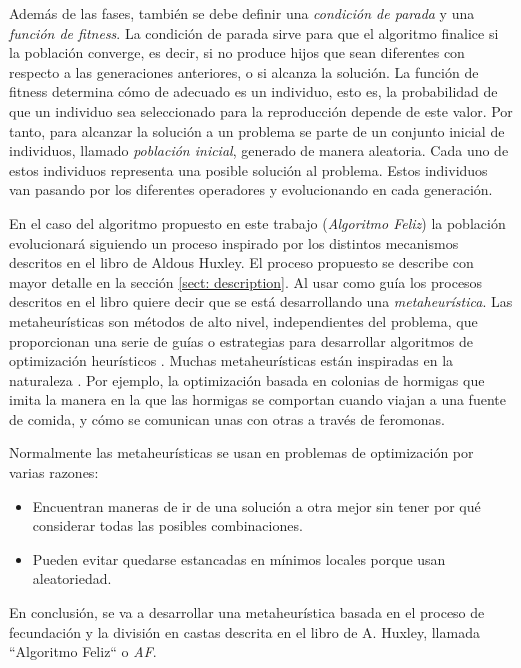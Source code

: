 Además de las fases, también se debe definir una \emph{condición de parada} y una \emph{función de fitness}. La
condición de parada sirve para que el algoritmo finalice si la población converge, es decir, si no produce hijos 
que sean diferentes con respecto a las generaciones anteriores, o si alcanza la solución. La función de fitness
determina cómo de adecuado es un individuo, esto es, la probabilidad de que un individuo sea seleccionado para
la reproducción depende de este valor. Por tanto, para alcanzar la solución a un problema se parte de un conjunto 
inicial de individuos, llamado \textit{población inicial}, generado de manera aleatoria. Cada uno de estos 
individuos representa una posible solución al problema. Estos individuos van pasando por los diferentes operadores y 
evolucionando en cada generación.

En el caso del algoritmo propuesto en este trabajo (\emph{Algoritmo Feliz}) la población evolucionará siguiendo un proceso 
inspirado por los distintos mecanismos descritos en el libro de Aldous Huxley. El proceso propuesto se describe con mayor detalle
en la sección \ref{sect: description}. Al usar como guía los procesos descritos en el libro quiere decir que se está desarrollando 
una \textit{metaheurística}. Las  metaheurísticas son métodos de alto nivel, independientes del problema, que proporcionan una serie de guías o
estrategias para desarrollar algoritmos de optimización heurísticos \cite{metaheuristics_def}. Muchas metaheurísticas
están inspiradas en la naturaleza \cite{Molina2020ComprehensiveTO}. Por ejemplo, la optimización basada en colonias de
hormigas que imita la manera en la que las hormigas se comportan cuando viajan a una fuente de comida, y cómo se 
comunican unas con otras a través de feromonas. 

Normalmente las metaheurísticas se usan en problemas de optimización por varias razones:
\begin{itemize}
    \item Encuentran maneras de ir de una solución a otra mejor sin tener por qué considerar todas las posibles combinaciones. 
    \item Pueden evitar quedarse estancadas en mínimos locales porque usan aleatoriedad.
\end{itemize}

En conclusión, se va a desarrollar una metaheurística basada en el proceso de fecundación y la división en castas descrita en el 
libro de A. Huxley, llamada ``Algoritmo Feliz`` o \emph{AF}.

